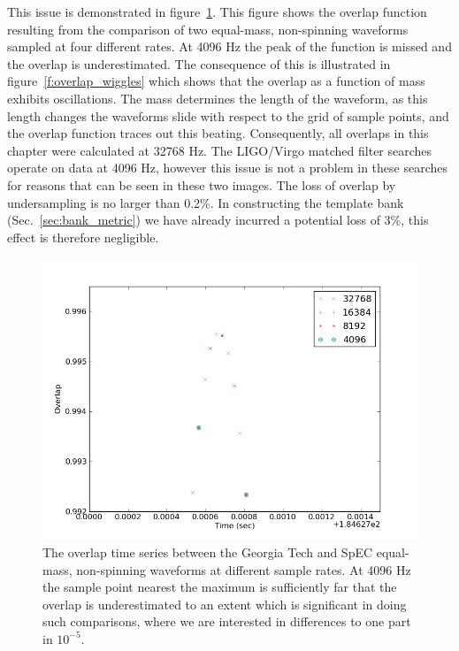 This issue is demonstrated in figure~\ref{f:overlap_sample_frequency}.
This figure shows the overlap function resulting from the comparison
of two equal-mass, non-spinning waveforms sampled at four different
rates.  At 4096 Hz the peak of the function is missed and the overlap
is underestimated.  The consequence of this is illustrated in
figure~\ref{f:overlap_wiggles} which shows that the overlap as a
function of mass exhibits oscillations.  The mass determines the
length of the waveform, as this length changes the waveforms slide
with respect to the grid of sample points, and the overlap function
traces out this beating.  Consequently, all overlaps in this chapter
were calculated at 32768 Hz.  The LIGO/Virgo matched filter searches
operate on data at 4096 Hz, however this issue is not a problem in
these searches for reasons that can be seen in these two images.  The
loss of overlap by undersampling is no larger than 0.2\%.  In
constructing the template bank (Sec.~\ref{sec:bank_metric}) we have already 
incurred a potential loss of 3\%, this effect is therefore negligible.

\begin{figure}
  \includegraphics[width=\linewidth]{figures/ninja2/overlap_time_series}
  \caption[Sensitivity of the overlaps to sample rate]{
  \label{f:overlap_sample_frequency}
The overlap time series between the Georgia Tech and SpEC equal-mass,
non-spinning waveforms at different sample rates.  At 4096 Hz the
sample point nearest the maximum is sufficiently far that the overlap
is underestimated to an extent which is significant in doing such
comparisons, where we are interested in differences to one part in
$10^{-5}$.
}
\end{figure}%

